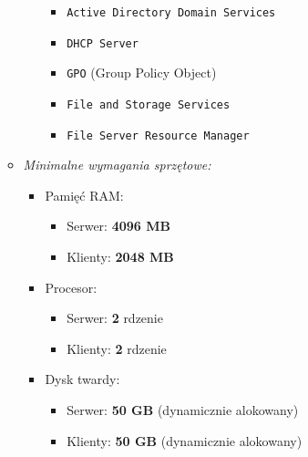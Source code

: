 \begin{itemize}
\begin{itemize}
\begin{itemize}
\begin{itemize}
 \item \texttt{Active Directory Domain Services} 
 \item \texttt{DHCP Server}
 \item \texttt{GPO} (Group Policy Object)
 \item \texttt{File and Storage Services}
 \item \texttt{File Server Resource Manager}
\end{itemize}
\end{itemize}
\clearpage
\item \textit{Minimalne wymagania sprzętowe:}
\begin{itemize}
\item Pamięć RAM:
\begin{itemize}
\item Serwer: \textbf{4096 MB}
\item Klienty: \textbf{2048 MB}
\end{itemize}
\item Procesor:
\begin{itemize}
\item Serwer: \textbf{2} rdzenie
\item Klienty: \textbf{2} rdzenie
\end{itemize}
\item Dysk twardy:
\begin{itemize}
\item Serwer: \textbf{50 GB} (dynamicznie alokowany)
\item Klienty: \textbf{50 GB} (dynamicznie alokowany)
\end{itemize}
\end{itemize}
\end{itemize}


\end{itemize}
